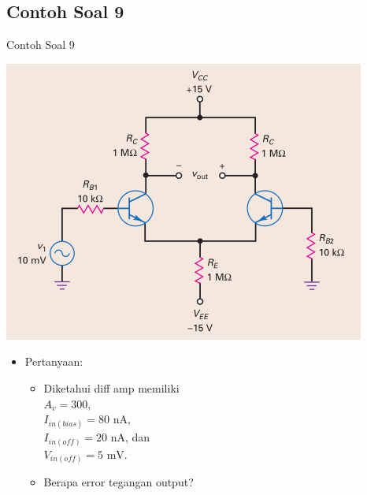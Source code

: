 \documentclass[aspectratio=169]{beamer}
\begin{document}
\subsection{Contoh Soal 9}
\begin{frame}{Contoh Soal 9}
	\begin{multicols}{2}
		\begin{center}
			\includegraphics[height=0.7\textheight]{gambar/01.diff-amp/01.contoh_soal_9}
		\end{center}
		\columnbreak
		\begin{itemize}
			\item Pertanyaan:
			\begin{itemize}
				\item Diketahui diff amp memiliki\\
				$ A_v = 300 $, \\
				$ I_{in(bias)} = 80 \text{ nA}$, \\
				$ I_{in(off)} = 20 \text{ nA}$, dan \\
				$ V_{in(off)} = 5 \text{ mV}$.
				\item Berapa error tegangan output?
			\end{itemize}
		\end{itemize}
	\end{multicols}
\end{frame}
\end{document}
